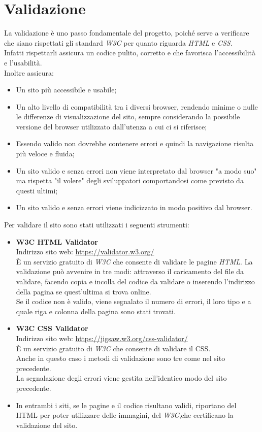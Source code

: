 \section{Validazione}
La validazione è uno passo fondamentale del progetto, poiché serve a verificare che siano rispettati gli standard \emph{W3C} per quanto riguarda \emph{HTML} e \emph{CSS}.\\
Infatti rispettarli assicura un codice pulito, corretto e che favorisca l'accessibilità e l'usabilità.\\
Inoltre assicura:
\begin{itemize}
	\item Un sito più accessibile e usabile;
	\item Un alto livello di compatibilità tra i diversi browser, rendendo minime o nulle le differenze di visualizzazione del sito, sempre considerando la possibile versione del browser utilizzato dall'utenza a cui ci si riferisce;
	\item Essendo valido non dovrebbe contenere errori e quindi la navigazione risulta più veloce e fluida;
	\item Un sito valido e senza errori non viene interpretato dal browser "a modo suo" ma rispetta "il volere" degli sviluppatori comportandosi come previsto da questi ultimi; %
	\item Un sito valido e senza errori viene indicizzato in modo positivo dal browser.  %
\end{itemize}
Per validare il sito sono stati utilizzati i seguenti strumenti:
\begin{itemize}
	\item \textbf{W3C HTML Validator}\\
	Indirizzo sito web: \url{https://validator.w3.org/}\\
	È un servizio gratuito di \emph{W3C} che consente di validare le pagine \emph{HTML}.
	La validazione può avvenire in tre modi: attraverso il caricamento del file da validare, facendo copia e incolla del codice da validare o inserendo l'indirizzo della pagina se quest'ultima si trova online.\\
Se il codice non è valido, viene segnalato il numero di errori, il loro tipo e a quale riga e colonna della pagina sono stati trovati.
	\item \textbf{W3C CSS Validator}\\
	Indirizzo sito web: \url{https://jigsaw.w3.org/css-validator/}\\
	È un servizio gratuito di \emph{W3C} che consente di validare il CSS.\\
	Anche in questo caso i metodi di validazione sono tre come nel sito precedente.\\
	La segnalazione degli errori viene gestita nell'identico modo del sito precedente.\\
	 \item In entrambi i siti, se le pagine e il codice risultano validi, riportano del HTML per poter utilizzare delle immagini, del \emph{W3C},che certificano la validazione del sito.
\end{itemize}
